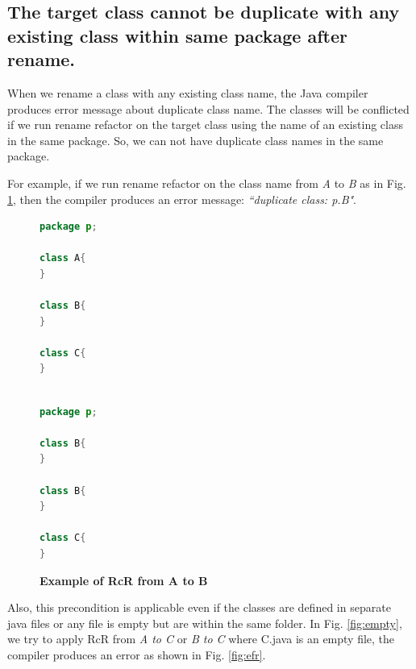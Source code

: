 \subsection{The target class cannot be duplicate with any existing class within same package after rename.}

When we rename a class with any existing class name, the Java compiler produces error message about duplicate class name. The classes will be conflicted if we run rename refactor on the target class using the name of an existing class in the same package. So, we can not have duplicate class names in the same package. 

For example, if we run rename refactor on the class name from \textsl{A} to \textsl{B} as in Fig. \ref{fig:afterrr}, then the compiler produces an error message: \textit{``duplicate class: p.B"}.

\begin{figure}[th]
\centering
\begin{minipage}[t]{0.45\linewidth}
\begin{lstlisting}[language=java, basicstyle=\scriptsize\ttfamily,frame=single]
package p;

class A{
}
	
class B{
}

class C{
}
 
\end{lstlisting}
\end{minipage}
\hfill
\begin{minipage}[t]{0.45\linewidth}
\begin{lstlisting}[language=java, basicstyle=\scriptsize\ttfamily,frame=single]
package p;

class B{
}	

class B{
}

class C{
}

\end{lstlisting}
\end{minipage}
\caption{\textbf{Example of RcR from A to B}}
\label{fig:afterrr}
\end{figure}


Also, this precondition is applicable even if the classes are defined in separate java files or any file is empty but are within the same folder. In Fig. \ref{fig:empty}, we try to apply RcR from \emph{A to C} or \emph{B to C} where C.java is an empty file, the compiler produces an error as shown in Fig. \ref{fig:efr}. 

